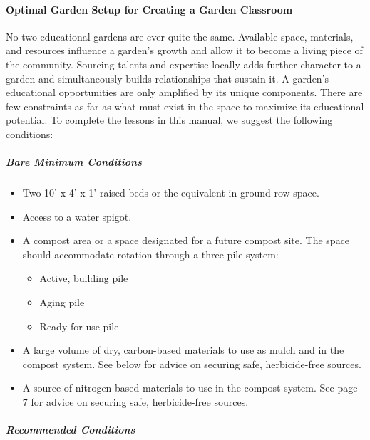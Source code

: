 \documentclass[12pt,]{article}
\providecommand{\tightlist}{%
  \setlength{\itemsep}{0pt}\setlength{\parskip}{0pt}}
\let\oldparagraph\paragraph
\renewcommand{\paragraph}[1]{\oldparagraph{#1}\mbox{}}
\let\oldsubparagraph\subparagraph
\renewcommand{\subparagraph}[1]{\oldsubparagraph{#1}\mbox{}}
\begin{document}
\hypertarget{optimal-garden-setup-for-creating-a-garden-classroom}{%
\paragraph{Optimal Garden Setup for Creating a Garden Classroom}\label{optimal-garden-setup-for-creating-a-garden-classroom}}

No two educational gardens are ever quite the same. Available space, materials, and resources influence a garden's growth and allow it to become a living piece of the community. Sourcing talents and expertise locally adds further character to a garden and simultaneously builds relationships that sustain it. A garden's educational opportunities are only amplified by its unique components. There are few constraints as far as what must exist in the space to maximize its educational potential. To complete the lessons in this manual, we suggest the following conditions:

\hypertarget{bare-minimum-conditions}{%
\subparagraph{Bare Minimum Conditions}\label{bare-minimum-conditions}}

\begin{itemize}
\tightlist
\item
  Two 10' x 4' x 1' raised beds or the equivalent in-ground row space.
\item
  Access to a water spigot.
\item
  A compost area or a space designated for a future compost site. The space should accommodate rotation through a three pile system:

  \begin{itemize}
  \tightlist
  \item
    Active, building pile
  \item
    Aging pile
  \item
    Ready-for-use pile
  \end{itemize}
\item
  A large volume of dry, carbon-based materials to use as mulch and in the compost system. See below for advice on securing safe, herbicide-free sources.
\item
  A source of nitrogen-based materials to use in the compost system. See page 7 for advice on securing safe, herbicide-free sources.
\end{itemize}

\hypertarget{recommended-conditions}{%
\subparagraph{Recommended Conditions}\label{recommended-conditions}}
\end{document}
